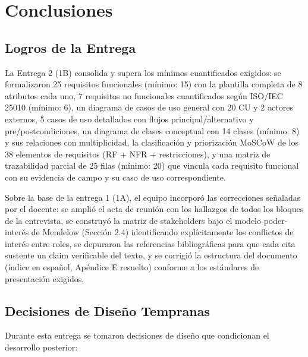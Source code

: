 \documentclass[11pt,a4paper]{article}
\begin{document}
\section{Conclusiones}
\subsection{Logros de la Entrega}

La Entrega 2 (1B) consolida y supera los mínimos cuantificados exigidos: se formalizaron 25 requisitos funcionales (mínimo: 15) con la plantilla completa de 8 atributos cada uno, 7 requisitos no funcionales cuantificados según ISO/IEC 25010 (mínimo: 6), un diagrama de casos de uso general con 20 CU y 2 actores externos, 5 casos de uso detallados con flujos principal/alternativo y pre/postcondiciones, un diagrama de clases conceptual con 14 clases (mínimo: 8) y sus relaciones con multiplicidad, la clasificación y priorización MoSCoW de los 38 elementos de requisitos (RF + NFR + restricciones), y una matriz de trazabilidad parcial de 25 filas (mínimo: 20) que vincula cada requisito funcional con su evidencia de campo y su caso de uso correspondiente.

Sobre la base de la entrega 1 (1A), el equipo incorporó las correcciones señaladas por el docente: se amplió el acta de reunión con los hallazgos de todos los bloques de la entrevista, se construyó la matriz de stakeholders bajo el modelo poder-interés de Mendelow (Sección 2.4) identificando explícitamente los conflictos de interés entre roles, se depuraron las referencias bibliográficas para que cada cita sustente un claim verificable del texto, y se corrigió la estructura del documento (índice en español, Apéndice E resuelto) conforme a los estándares de presentación exigidos.

\subsection{Decisiones de Diseño Tempranas}

Durante esta entrega se tomaron decisiones de diseño que condicionan el desarrollo posterior:
\end{document}

